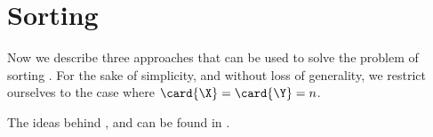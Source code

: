 \chapter{Sorting \XY}

Now we describe three approaches that can be used to solve the problem
of sorting \XY. For the sake of simplicity, and without loss of generality,
we restrict ourselves to the case where $\card{\X} = \card{\Y} = n$.

The ideas behind ,  and
 can be found in \citet*{harper:1975}.
